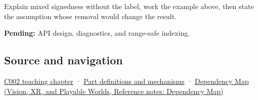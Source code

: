 Explain mixed signedness without the label, work the example above, then state the assumption whose removal would change the result.

\textbf{Pending:} API design, diagnostics, and range-safe indexing.

\subsection{Source and navigation}\label{appendix-736a2345de4a-source-and-navigation}

\hyperref[01-foundations-i-ch001-arithmetic-becomes-a-policy]{C002 teaching chapter} · \hyperref[appendix-fd090d982a15]{Part definitions and mechanisms} · \href{../07-Vision-XR-and-Playable-Worlds/main.pdf\#nameddest=appendix-4ad47bdd269a}{Dependency Map (Vision, XR, and Playable Worlds, Reference notes: Dependency Map)}
